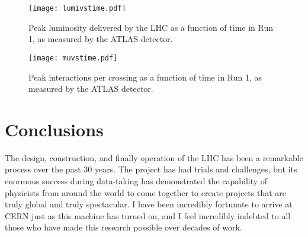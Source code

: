 \begin{figure}
\centering
\texttt{[image: lumivstime.pdf]}
\caption{Peak luminosity delivered by the LHC as a function of time in Run 1, as measured by the ATLAS detector.}
\label{fig:lhc:lumivstime}
\end{figure}




\begin{figure}
\centering
\texttt{[image: muvstime.pdf]}
\caption{Peak interactions per crossing as a function of time in Run 1, as measured by the ATLAS detector.}
\label{fig:lhc:muvstime}
\end{figure}


\section{Conclusions}

The design, construction, and finally operation of the LHC has been a remarkable process over the past 30 years. The project has had trials and challenges, but its enormous success during data-taking has demonstrated the capability of physicists from around the world to come together to create projects that are truly global and truly spectacular. I have been incredibly fortunate to arrive at CERN just as this machine has turned on, and I feel incredibly indebted to all those who have made this research possible over decades of work.

